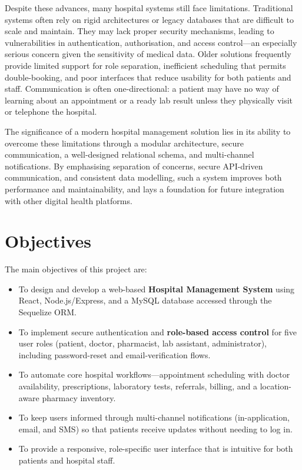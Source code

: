 \documentclass[12pt,a4paper]{report}
\begin{document}
Despite these advances, many hospital systems still face limitations. Traditional
systems often rely on rigid architectures or legacy databases that are difficult to
scale and maintain. They may lack proper security mechanisms, leading to
vulnerabilities in authentication, authorisation, and access control---an especially
serious concern given the sensitivity of medical data. Older solutions frequently
provide limited support for role separation, inefficient scheduling that permits
double-booking, and poor interfaces that reduce usability for both patients and staff.
Communication is often one-directional: a patient may have no way of learning about an
appointment or a ready lab result unless they physically visit or telephone the
hospital.

The significance of a modern hospital management solution lies in its ability to
overcome these limitations through a modular architecture, secure communication, a
well-designed relational schema, and multi-channel notifications. By emphasising
separation of concerns, secure API-driven communication, and consistent data modelling,
such a system improves both performance and maintainability, and lays a foundation for
future integration with other digital health platforms.

\section{Objectives}
The main objectives of this project are:
\begin{itemize}[leftmargin=1.4em]
  \item To design and develop a web-based \textbf{Hospital Management System} using
        React, Node.js/Express, and a MySQL database accessed through the Sequelize ORM.
  \item To implement secure authentication and \textbf{role-based access control} for
        five user roles (patient, doctor, pharmacist, lab assistant, administrator),
        including password-reset and email-verification flows.
  \item To automate core hospital workflows---appointment scheduling with doctor
        availability, prescriptions, laboratory tests, referrals, billing, and a
        location-aware pharmacy inventory.
  \item To keep users informed through multi-channel notifications (in-application,
        email, and SMS) so that patients receive updates without needing to log in.
  \item To provide a responsive, role-specific user interface that is intuitive for
        both patients and hospital staff.
\end{itemize}
\end{document}
